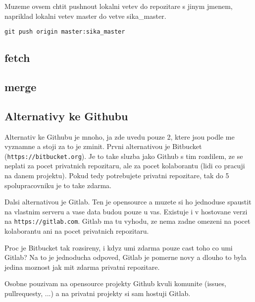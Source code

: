 \documentclass[12pt,a5paper]{article}
\begin{document}
Muzeme ovsem chtit pushnout lokalni vetev do repozitare s jinym jmenem, napriklad lokalni vetev master do vetve sika\_master.

\begin{lstlisting}
git push origin master:sika_master
\end{lstlisting}

\subsection{fetch}
\subsection{merge}

\subsection{Alternativy ke Githubu}

Alternativ ke Githubu je mnoho, ja zde uvedu pouze 2, ktere jsou podle me vyznamne a stoji za to je zminit. Prvni alternativou je Bitbucket (\lstinline|https://bitbucket.org|). Je to take sluzba jako Github s tim rozdilem, ze se neplati za pocet privatnich repozitaru, ale za pocet kolaborantu (lidi co pracuji na danem projektu). Pokud tedy potrebujete privatni repozitare, tak do 5 spolupracovniku je to take zdarma.

Dalsi alternativou je Gitlab. Ten je opensource a muzete si ho jednoduse spaustit na vlastnim serveru a vase data budou pouze u vas. Existuje i v hostovane verzi na \lstinline|https://gitlab.com|. Gitlab ma tu vyhodu, ze nema zadne omezeni na pocet kolaborantu ani na pocet privatnich repozitaru.

Proc je Bitbucket tak rozsireny, i kdyz umi zdarma pouze cast toho co umi Gitlab? Na to je jednoducha odpoved, Gitlab je pomerne novy a dlouho to byla jedina moznost jak mit zdarma privatni repozitare.

Osobne pouzivam na opensource projekty Github kvuli komunite (issues, pullrequesty, ...) a na privatni projekty si sam hostuji Gitlab.

\end{document}
